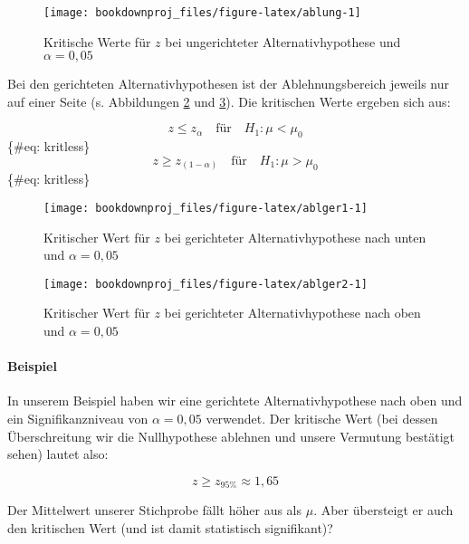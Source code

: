 \documentclass[
  ngerman,
]{article}
\begin{document}
\begin{figure}[h]

{\centering \texttt{[image: bookdownproj\_files/figure-latex/ablung-1]} 

}

\caption{Kritische Werte für $z$ bei ungerichteter Alternativhypothese und $\alpha=0{,}05$}\label{fig:ablung}
\end{figure}

Bei den gerichteten Alternativhypothesen ist der Ablehnungsbereich jeweils nur auf einer Seite (s. Abbildungen \ref{fig:ablger1} und \ref{fig:ablger2}). Die kritischen Werte ergeben sich aus:

\[
z \leq z_{\alpha} \quad \textrm{für} \quad H_1: \mu < \mu_0
\]\{\#eq: kritless\}
\[
z \geq z_{(1-\alpha)} \quad \textrm{für} \quad H_1: \mu > \mu_0
\]\{\#eq: kritless\}

\begin{figure}[h]

{\centering \texttt{[image: bookdownproj\_files/figure-latex/ablger1-1]} 

}

\caption{Kritischer Wert für $z$ bei gerichteter Alternativhypothese nach unten und $\alpha=0{,}05$}\label{fig:ablger1}
\end{figure}

\begin{figure}[h]

{\centering \texttt{[image: bookdownproj\_files/figure-latex/ablger2-1]} 

}

\caption{Kritischer Wert für $z$ bei gerichteter Alternativhypothese nach oben und $\alpha=0{,}05$}\label{fig:ablger2}
\end{figure}

\hypertarget{beispiel-3}{%
\paragraph{Beispiel}\label{beispiel-3}}

In unserem Beispiel haben wir eine gerichtete Alternativhypothese nach oben und ein Signifikanzniveau von \(\alpha=0{,}05\) verwendet. Der kritische Wert (bei dessen Überschreitung wir die Nullhypothese ablehnen und unsere Vermutung bestätigt sehen) lautet also:

\[
z \geq z_{95\%}\approx 1{,}65
\]

Der Mittelwert unserer Stichprobe fällt höher aus als \(\mu\). Aber übersteigt er auch den kritischen Wert (und ist damit statistisch signifikant)?
\end{document}
